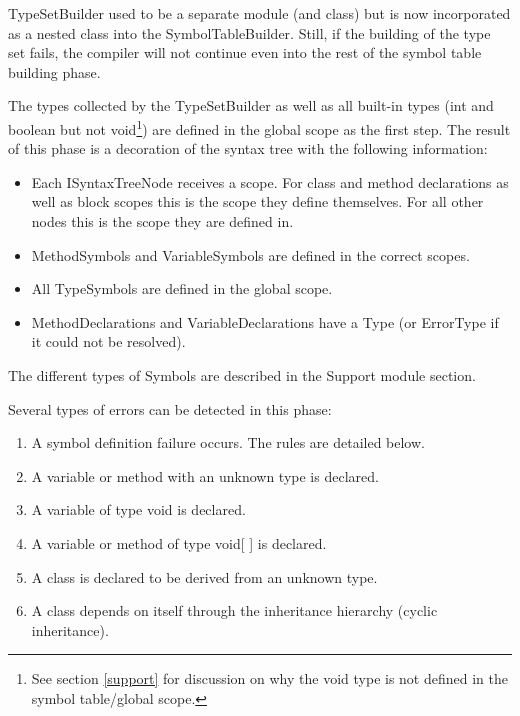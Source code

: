 \documentclass[a4paper,11pt]{article}
\begin{document}
TypeSetBuilder used to be a separate module (and class) but is now incorporated as a nested class into the SymbolTableBuilder. Still, if the building of the type set fails, the compiler will not continue even into the rest of the symbol table building phase.

The types collected by the TypeSetBuilder as well as all built-in types (int and boolean but not void\footnote{See section \ref{support} for discussion on why the void type is not defined in the symbol table/global scope.}) are defined in the global scope as the first step. The result of this phase is a decoration of the syntax tree with the following information:

\begin{itemize}
    \item Each ISyntaxTreeNode receives a scope. For class and method declarations as well as block scopes this is the scope they define themselves. For all other nodes this is the scope they are defined in.
    \item MethodSymbols and VariableSymbols are defined in the correct scopes.
    \item All TypeSymbols are defined in the global scope.
    \item MethodDeclarations and VariableDeclarations have a Type (or ErrorType if it could not be resolved).
\end{itemize}

The different types of Symbols are described in the Support module section.

Several types of errors can be detected in this phase:
\begin{enumerate}
    \item A symbol definition failure occurs. The rules are detailed below.
    \item A variable or method with an unknown type is declared.
    \item A variable of type void is declared.
    \item A variable or method of type void[ ] is declared.
    \item A class is declared to be derived from an unknown type.
    \item A class depends on itself through the inheritance hierarchy (cyclic inheritance).
\end{enumerate}
\end{document}
